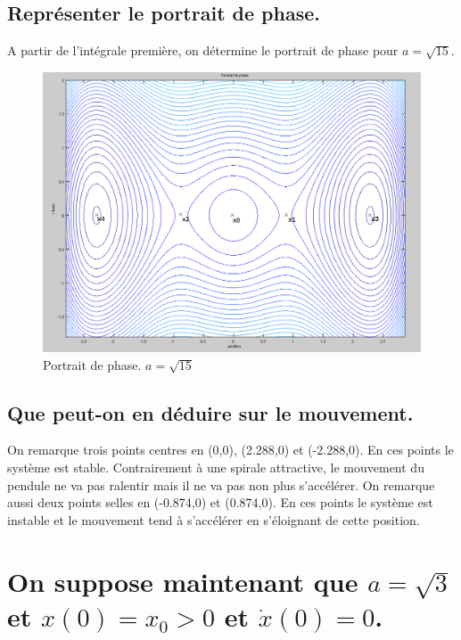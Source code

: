 \documentclass[10pt,a4paper]{article}
\begin{document}
 

	
\subsection{Représenter le portrait de phase.}
A partir de l'intégrale première, on détermine le portrait de phase pour $a=\sqrt{15}$.
\begin{figure}[H]
	\includegraphics[scale=0.5]{PortraitDePhasePointsVisibles.png}
	\caption{Portrait de phase. $a=\sqrt{15}$}
\end{figure} 

\subsection{Que peut-on en déduire sur le mouvement.}
On remarque trois points centres en (0,0), (2.288,0) et (-2.288,0). En ces points le système est stable. Contrairement à une spirale attractive, le mouvement du pendule ne va pas ralentir mais il ne va pas non plus s'accélérer.  On remarque aussi deux points selles en (-0.874,0) et (0.874,0). En ces points le système est instable et le mouvement tend à s'accélérer en s'éloignant de cette position.%

\section{On suppose maintenant que $a=\sqrt{3}$ et $x(0)=x_0>0$ et $\dot{x}(0)=0$.}
\end{document}
